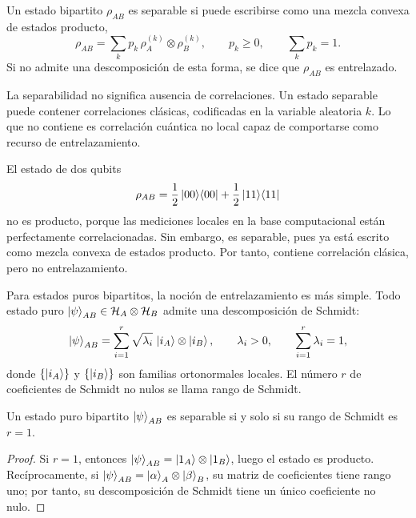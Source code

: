 \documentclass[../main.tex]{subfiles}
\begin{document}
\begin{definicion}
Un estado bipartito \(\rho_{AB}\) es separable si puede escribirse como una mezcla convexa de estados producto,
\begin{equation}
    \rho_{AB}=\sum_k p_k\,\rho_A^{(k)}\otimes\rho_B^{(k)},
    \qquad
    p_k\geq0,
    \qquad
    \sum_k p_k=1.
    \label{eq:estado-separable}
\end{equation}
Si no admite una descomposición de esta forma, se dice que \(\rho_{AB}\) es entrelazado.
\end{definicion}

La separabilidad no significa ausencia de correlaciones. Un estado separable puede contener correlaciones clásicas, codificadas en la variable aleatoria \(k\). Lo que no contiene es correlación cuántica no local capaz de comportarse como recurso de entrelazamiento.

\begin{ejemplo}
El estado de dos qubits
\begin{equation*}
    \rho_{AB}=\frac{1}{2}\ket{00}\!\bra{00}+\frac{1}{2}\ket{11}\!\bra{11}
\end{equation*}
no es producto, porque las mediciones locales en la base computacional están perfectamente correlacionadas. Sin embargo, es separable, pues ya está escrito como mezcla convexa de estados producto. Por tanto, contiene correlación clásica, pero no entrelazamiento.
\end{ejemplo}

Para estados puros bipartitos, la noción de entrelazamiento es más simple. Todo estado puro \(\ket{\psi}_{AB}\in\mathcal{H}_A\otimes\mathcal{H}_B\) admite una descomposición de Schmidt:
\begin{equation}
    \ket{\psi}_{AB}=\sum_{i=1}^{r}\sqrt{\lambda_i}\,\ket{i_A}\otimes\ket{i_B},
    \qquad
    \lambda_i>0,
    \qquad
    \sum_{i=1}^{r}\lambda_i=1,
    \label{eq:schmidt}
\end{equation}
donde \(\{\ket{i_A}\}\) y \(\{\ket{i_B}\}\) son familias ortonormales locales. El número \(r\) de coeficientes de Schmidt no nulos se llama rango de Schmidt.

\begin{proposicion}
Un estado puro bipartito \(\ket{\psi}_{AB}\) es separable si y solo si su rango de Schmidt es \(r=1\).
\end{proposicion}

\begin{proof}
Si \(r=1\), entonces \(\ket{\psi}_{AB}=\ket{1_A}\otimes\ket{1_B}\), luego el estado es producto. Recíprocamente, si \(\ket{\psi}_{AB}=\ket{\alpha}_A\otimes\ket{\beta}_B\), su matriz de coeficientes tiene rango uno; por tanto, su descomposición de Schmidt tiene un único coeficiente no nulo.
\end{proof}
\end{document}
